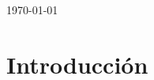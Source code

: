 \documentclass[12pt]{article}
\begin{document}
\begin{titlepage}

{\large \today}\\[2cm] %

\vfill %

\end{titlepage}

\clearpage

\section{Introducción}
\label{sec:introduccion}
\end{document}
